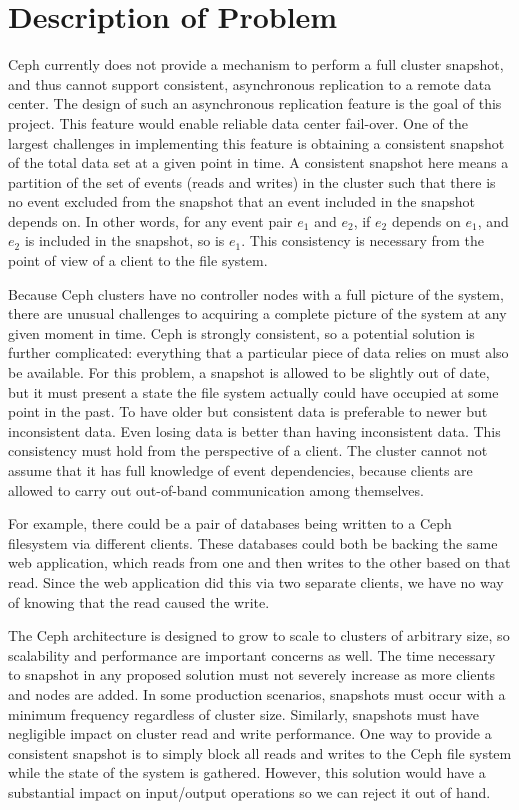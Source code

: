 \chapter{Description of Problem}
\label{sec:description}

Ceph currently does not provide a mechanism to perform a full cluster
snapshot, and thus cannot support consistent, asynchronous replication
to a remote data center. The design of such an asynchronous
replication feature is the goal of this project.  This feature would
enable reliable data center fail-over. One of the largest challenges
in implementing this feature is obtaining a consistent snapshot of the
total data set at a given point in time. A consistent snapshot here
means a partition of the set of events (reads and writes) in the
cluster such that there is no event excluded from the snapshot that an
event included in the snapshot depends on. In other words, for any
event pair $e_1$ and $e_2$, if $e_2$ depends on $e_1$, and $e_2$ is
included in the snapshot, so is $e_1$. This consistency is necessary
from the point of view of a client to the file system.

Because Ceph clusters have no controller nodes with a full picture of
the system, there are unusual challenges to acquiring a complete
picture of the system at any given moment in time. Ceph is strongly
consistent, so a potential solution is further complicated: everything
that a particular piece of data relies on must also be available. For
this problem, a snapshot is allowed to be slightly out of date, but it
must present a state the file system actually could have occupied at
some point in the past. To have older but consistent data is
preferable to newer but inconsistent data. Even losing data is better
than having inconsistent data. This consistency must hold from the
perspective of a client. The cluster cannot not assume that it has
full knowledge of event dependencies, because clients are allowed to
carry out out-of-band communication among themselves.

For example, there could be a pair of databases being written to a
Ceph filesystem via different clients. These databases could both be
backing the same web application, which reads from one and then writes
to the other based on that read. Since the web application did this
via two separate clients, we have no way of knowing that the read
caused the write.

The Ceph architecture is designed to grow to scale to clusters of
arbitrary size, so scalability and performance are important concerns
as well. The time necessary to snapshot in any proposed solution must
not severely increase as more clients and nodes are added. In some
production scenarios, snapshots must occur with a minimum frequency
regardless of cluster size. Similarly, snapshots must have negligible
impact on cluster read and write performance. One way to provide a
consistent snapshot is to simply block all reads and writes to the
Ceph file system while the state of the system is gathered. However,
this solution would have a substantial impact on input/output
operations so we can reject it out of hand.

